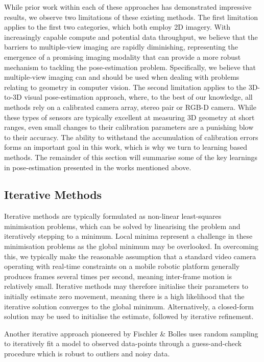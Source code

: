 While prior work within each of these approaches has demonstrated impressive results, we observe two limitations of these existing methods. The first limitation applies to the first two categories, which both employ 2D imagery. With increasingly capable compute and potential data throughput, we believe that the barriers to multiple-view imaging are rapidly diminishing, representing the emergence of a promising imaging modality that can provide a more robust mechanism to tackling the pose-estimation problem. Specifically, we believe that multiple-view imaging can and should be used when dealing with problems relating to geometry in computer vision. The second limitation applies to the 3D-to-3D visual pose-estimation approach, where, to the best of our knowledge, all methods rely on a calibrated camera array, stereo pair or RGB-D camera. While these types of sensors are typically excellent at measuring 3D geometry at short ranges, even small changes to their calibration parameters are a punishing blow to their accuracy. The ability to withstand the accumulation of calibration errors forms an important goal in this work, which is why we turn to learning based methods. The remainder of this section will summarise some of the key learnings in pose-estimation presented in the works mentioned above.

\subsection{Iterative Methods}
Iterative methods are typically formulated as non-linear least-squares minimisation problems, which can be solved by linearising the problem and iteratively stepping to a minimum. Local minima represent a challenge in these minimisation problems as the global minimum may be overlooked. In overcoming this, we typically make the reasonable assumption that a standard video camera operating with real-time constraints on a mobile robotic platform generally produces frames several times per second, meaning inter-frame motion is relatively small. Iterative methods may therefore initialise their parameters to initially estimate zero movement, meaning there is a high likelihood that the iterative solution converges to the global minimum. Alternatively, a closed-form solution may be used to initialise the estimate, followed by iterative refinement.

Another iterative approach pioneered by Fischler \& Bolles \cite{bolles1981ransac} uses random sampling to iteratively fit a model to observed data-points through a guess-and-check procedure which is robust to outliers and noisy data.

